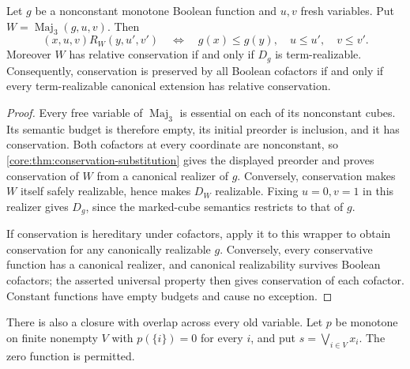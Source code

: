 \begin{corollary}
\label{core:cor:conservation-majority-wrapper}
Let $g$ be a nonconstant monotone Boolean function and $u,v$ fresh variables.
Put $W=\operatorname{Maj}_3(g,u,v)$. Then
\[
 (x,u,v)R_W(y,u',v')\quad\Longleftrightarrow\quad
 g(x)\leq g(y),\quad u\leq u',\quad v\leq v'.
\]
Moreover $W$ has relative conservation if and only if $D_g$ is
term-realizable. Consequently, conservation is preserved by all Boolean
cofactors if and only if every term-realizable canonical extension has
relative conservation.
\end{corollary}
\begin{proof}
Every free variable of $\operatorname{Maj}_3$ is essential on each of its
nonconstant cubes. Its semantic budget is therefore empty, its initial
preorder is inclusion, and it has conservation. Both cofactors at every
coordinate are nonconstant, so \cref{core:thm:conservation-substitution}
gives the displayed preorder and proves conservation of $W$ from a
canonical realizer of $g$. Conversely, conservation makes $W$ itself
safely realizable, hence makes $D_W$ realizable. Fixing $u=0,v=1$ in this realizer gives $D_g$, since the marked-cube
semantics restricts to that of $g$.

If conservation is hereditary under cofactors, apply it to this wrapper
to obtain conservation for any canonically realizable $g$. Conversely,
every conservative function has a canonical realizer, and canonical
realizability survives Boolean cofactors; the asserted universal property
then gives conservation of each cofactor. Constant functions have empty
budgets and cause no exception.
\end{proof}

There is also a closure with overlap across every old variable. Let
$p$ be monotone on finite nonempty $V$ with $p(\{i\})=0$ for every $i$,
and put $s=\bigvee_{i\in V}x_i$. The zero function is permitted.

